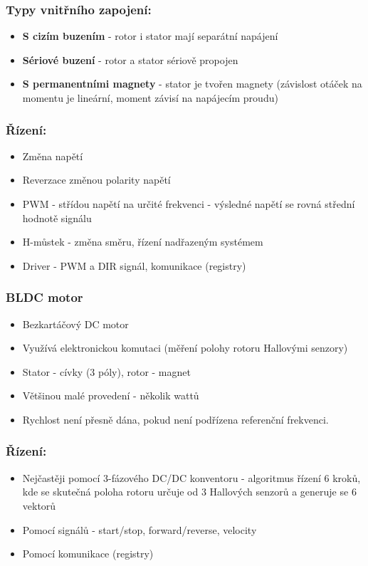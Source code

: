 \subsubsection*{Typy vnitřního zapojení:}
\begin{itemize}
    \item \textbf{S cizím buzením} - rotor i stator mají separátní napájení
    \item \textbf{Sériové buzení} - rotor a stator sériově propojen
    \item \textbf{S permanentními magnety} - stator je tvořen magnety (závislost otáček na momentu je lineární, moment závisí na napájecím proudu)
\end{itemize}

\subsubsection*{Řízení:}
\begin{itemize}
    \item Změna napětí
    \item Reverzace změnou polarity napětí
    \item PWM - střídou napětí na určité frekvenci - výsledné napětí se rovná střední hodnotě signálu
    \item H-můstek - změna směru, řízení nadřazeným systémem
    \item Driver - PWM a DIR signál, komunikace (registry)
\end{itemize}

\subsubsection*{BLDC motor}
\begin{itemize}
    \item Bezkartáčový DC motor
    \item Využívá elektronickou komutaci (měření polohy rotoru Hallovými senzory)
    \item Stator - cívky (3 póly), rotor - magnet
    \item Většinou malé provedení - několik wattů
    \item Rychlost není přesně dána, pokud není podřízena referenční frekvenci.
\end{itemize}

\subsubsection*{Řízení:}
\begin{itemize}
    \item Nejčastěji pomocí 3-fázového DC/DC konventoru - algoritmus řízení 6 kroků, kde se skutečná poloha rotoru určuje od 3 Hallových senzorů a generuje se 6 vektorů
    \item Pomocí signálů - start/stop, forward/reverse, velocity
    \item Pomocí komunikace (registry)
\end{itemize}

